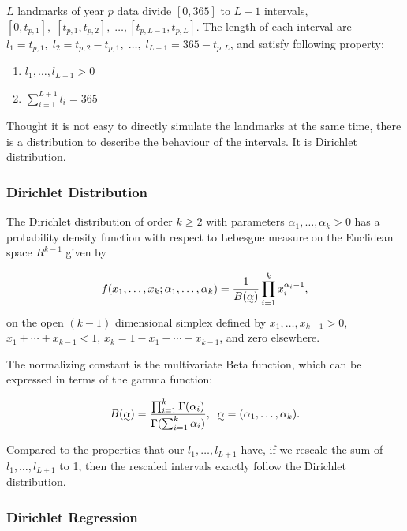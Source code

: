 \documentclass{article}\usepackage[]{graphicx}\usepackage[]{color}
\begin{document}
$L$ landmarks of year $p$ data divide $[0,365]$ to $L+1$ intervals, $[0,t_{p,1}],\;[t_{p,1},t_{p,2}],\;\dots,[t_{p,L-1},t_{p,L}]$.
The length of each interval are $l_1 = t_{p,1},\;l_2=t_{p,2}-t_{p,1},\;\dots,\;l_{L+1}=365-t_{p,L}$, and satisfy following property:

\begin{enumerate}
\item $l_1,\dots,l_{L+1}>0$
\item $\sum_{i=1}^{L+1}l_i = 365$
\end{enumerate}

Thought it is not easy to directly simulate the landmarks at the same time, there is a distribution to describe the behaviour of the intervals. It is Dirichlet distribution.  

\subsubsection{Dirichlet Distribution}


The Dirichlet distribution of order $k\ge2$ with parameters $\alpha_1,\dots,\alpha_k>0$ has a probability density function with respect to Lebesgue measure on the Euclidean space $R^{k-1}$ given by 

\begin{equation}
f(x_1,\dots,x_k;\alpha_1,\dots,\alpha_k) = \frac{1}{B(\uwave{\alpha})}\prod_{i=1}^kx_i^{\alpha_i-1},
\end{equation}
on the open $(k-1)$ dimensional simplex defined by  $x_1,\dots,x_{k-1}>0$, $x_1+\cdots+x_{k-1}<1$,  $x_k = 1- x_1-\cdots-x_{k-1}$, and zero elsewhere.

The normalizing constant is the multivariate Beta function, which can be expressed in terms of the gamma function:

\begin{equation}
B(\uwave{\alpha}) = \frac{\prod_{i=1}^k\Gamma(\alpha_i)}{\Gamma(\sum_{i=1}^k\alpha_i)},\;\;\uwave{\alpha}=(\alpha_1,\dots,\alpha_k).
\end{equation}

Compared to the properties that our $l_1,\dots,l_{L+1}$ have, if we rescale the sum of $l_1,\dots,l_{L+1}$ to 1, then the rescaled intervals exactly follow the Dirichlet distribution.


\subsubsection{Dirichlet Regression}
\end{document}
